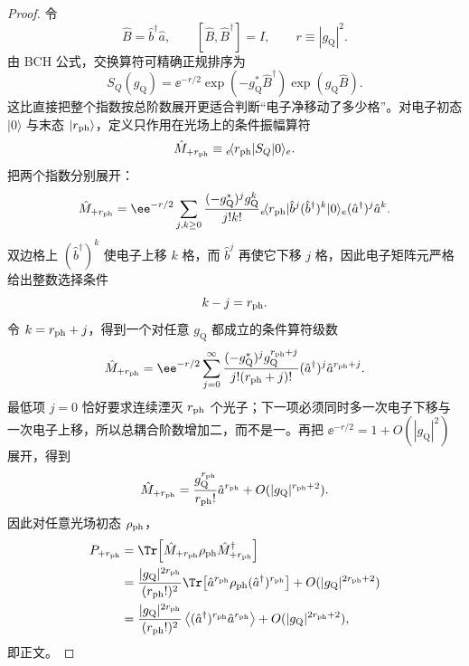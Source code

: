 \begin{proof}
令
\[
\hat B=\hat b^\dagger\hat a,
\qquad [\hat B,\hat B^\dagger]=I,
\qquad r\equiv|g_{\mathrm Q}|^2.
\]
由 BCH 公式，交换算符可精确正规排序为
\begin{equation*}
S_Q(g_{\mathrm Q})
=\ee^{-r/2}
\exp(-g_{\mathrm Q}^*\hat B^\dagger)
\exp(g_{\mathrm Q}\hat B).
\end{equation*}
这比直接把整个指数按总阶数展开更适合判断“电子净移动了多少格”。对电子初态 $|0\rangle$ 与末态 $|r_{\rm ph}\rangle$，定义只作用在光场上的条件振幅算符
\[
\hat M_{+r_{\rm ph}}
\equiv{}_e\!\langle r_{\rm ph}|S_Q|0\rangle_e.
\]
把两个指数分别展开：
\begin{align*}
\hat M_{+r_{\rm ph}}
=\ee^{-r/2}
\sum_{j,k\ge0}
\frac{(-g_{\mathrm Q}^*)^jg_{\mathrm Q}^k}{j!k!}
{}_e\!\langle r_{\rm ph}|
\hat b^j(\hat b^\dagger)^k|0\rangle_e
(\hat a^\dagger)^j\hat a^k.
\end{align*}
双边格上 $(\hat b^\dagger)^k$ 使电子上移 $k$ 格，而 $\hat b^j$ 再使它下移 $j$ 格，因此电子矩阵元严格给出整数选择条件
\[
k-j=r_{\rm ph}.
\]
令 $k=r_{\rm ph}+j$，得到一个对任意 $g_{\mathrm Q}$ 都成立的条件算符级数
\begin{equation*}
\hat M_{+r_{\rm ph}}
=\ee^{-r/2}
\sum_{j=0}^{\infty}
\frac{(-g_{\mathrm Q}^*)^jg_{\mathrm Q}^{r_{\rm ph}+j}}
{j!(r_{\rm ph}+j)!}
(\hat a^\dagger)^j\hat a^{r_{\rm ph}+j}.
\end{equation*}
最低项 $j=0$ 恰好要求连续湮灭 $r_{\rm ph}$ 个光子；下一项必须同时多一次电子下移与一次电子上移，所以总耦合阶数增加二，而不是一。再把 $\ee^{-r/2}=1+O(|g_{\mathrm Q}|^2)$ 展开，得到
\begin{equation*}
\hat M_{+r_{\rm ph}}
=\frac{g_{\mathrm Q}^{r_{\rm ph}}}{r_{\rm ph}!}\hat a^{r_{\rm ph}}
+O(|g_{\mathrm Q}|^{r_{\rm ph}+2}).
\end{equation*}
因此对任意光场初态 $\rho_{\rm ph}$，
\begin{align*}
P_{+r_{\rm ph}}
&=\Tr\!\left[
\hat M_{+r_{\rm ph}}\rho_{\rm ph}
\hat M_{+r_{\rm ph}}^\dagger\right]\\
&=\frac{|g_{\mathrm Q}|^{2r_{\rm ph}}}{(r_{\rm ph}!)^2}
\Tr\!\left[
\hat a^{r_{\rm ph}}\rho_{\rm ph}
(\hat a^\dagger)^{r_{\rm ph}}\right]
+O(|g_{\mathrm Q}|^{2r_{\rm ph}+2})\\
&=\frac{|g_{\mathrm Q}|^{2r_{\rm ph}}}{(r_{\rm ph}!)^2}
\left\langle(\hat a^\dagger)^{r_{\rm ph}}\hat a^{r_{\rm ph}}\right\rangle
+O(|g_{\mathrm Q}|^{2r_{\rm ph}+2}),
\end{align*}
即正文。
\end{proof}


